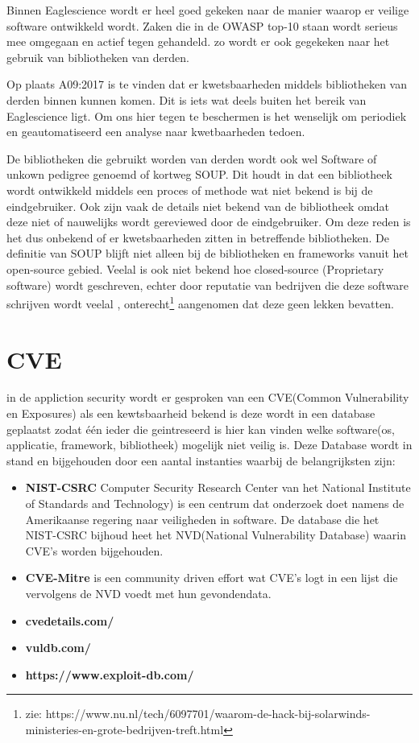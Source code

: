 Binnen Eaglescience wordt er heel goed gekeken naar de manier waarop er veilige software ontwikkeld wordt.
Zaken die in de OWASP top-10 staan wordt serieus mee omgegaan en actief tegen gehandeld. zo wordt er ook gegekeken naar het gebruik van bibliotheken van derden.

Op plaats A09:2017 is te vinden dat er kwetsbaarheden middels bibliotheken van derden binnen kunnen komen. Dit is iets wat deels buiten het bereik van Eaglescience ligt. Om ons hier tegen te beschermen is het wenselijk om periodiek en geautomatiseerd een analyse naar kwetbaarheden tedoen.

De bibliotheken die gebruikt worden van derden wordt ook wel Software of unkown pedigree genoemd of kortweg SOUP. Dit houdt in dat een bibliotheek wordt ontwikkeld middels een proces of methode wat niet bekend is bij de eindgebruiker. Ook zijn vaak de details niet bekend van de bibliotheek omdat deze niet of nauwelijks wordt gereviewed door de eindgebruiker. Om deze reden is het dus onbekend of er kwetsbaarheden zitten in betreffende bibliotheken.
De definitie van SOUP blijft niet alleen bij de bibliotheken en frameworks vanuit het open-source gebied. Veelal is ook niet bekend hoe closed-source (Proprietary software) wordt geschreven, echter door reputatie van bedrijven die deze software schrijven wordt veelal , onterecht\footnote{zie: https://www.nu.nl/tech/6097701/waarom-de-hack-bij-solarwinds-ministeries-en-grote-bedrijven-treft.html } aangenomen dat deze geen lekken bevatten.

\section{CVE}
in de appliction security wordt er gesproken van een CVE(Common Vulnerability en Exposures) als een kewtsbaarheid bekend is deze wordt in een database geplaatst zodat \'e\'en ieder die geintreseerd is hier kan vinden welke software(os, applicatie, framework, bibliotheek) mogelijk niet veilig is. Deze Database wordt in stand en bijgehouden door een aantal instanties waarbij de belangrijksten zijn:
\begin{itemize}
  \item \textbf{NIST-CSRC} Computer Security Research Center van het National Institute of Standards and Technology) is een centrum dat onderzoek doet namens de Amerikaanse regering naar veiligheden in software. De database die het NIST-CSRC bijhoud heet het NVD(National Vulnerability Database) waarin CVE's worden bijgehouden.
  \item \textbf{CVE-Mitre} is een community driven effort wat CVE's logt in een lijst die vervolgens de NVD voedt met hun gevondendata.
  \item \textbf{cvedetails.com/}
  \item \textbf{vuldb.com/}
  \item \textbf{https://www.exploit-db.com/}
\end{itemize}

